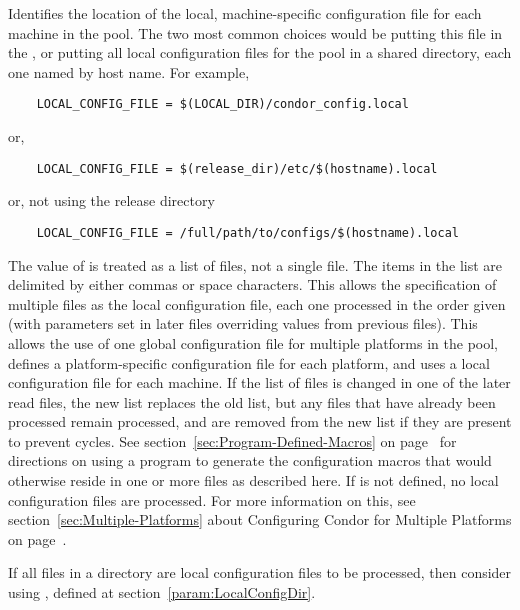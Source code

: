 \begin{description}
\label{param:LocalConfigFile}
\item[\Macro{LOCAL\_CONFIG\_FILE}]
  Identifies the
  location of the local, machine-specific configuration
  file for each machine
  in the pool.  The two most common choices would be putting this
  file in the , or putting all
  local configuration files for the pool in a shared directory, each one
  named by host name.  For example,
  \begin{verbatim}
    LOCAL_CONFIG_FILE = $(LOCAL_DIR)/condor_config.local
  \end{verbatim}
  or,
  \begin{verbatim}
    LOCAL_CONFIG_FILE = $(release_dir)/etc/$(hostname).local
  \end{verbatim}
  or, not using the release directory
  \begin{verbatim}
    LOCAL_CONFIG_FILE = /full/path/to/configs/$(hostname).local
  \end{verbatim}
  
  The value of  is treated as a list of files,
  not a
  single file.  The items in the list are delimited by either commas
  or space characters.
  This allows the specification of multiple files as
  the local configuration file, each one processed in the
  order given (with parameters set in later files overriding values
  from previous files).  This allows the use of one global
  configuration file for multiple platforms in the pool, defines a
  platform-specific configuration file for each platform, and uses a
  local configuration file for each machine. 
  If the list of files is changed in one of the later read files, the new list
  replaces the old list, but any files that have already been processed
  remain processed, and are removed from the new list if they are present
  to prevent cycles.
  See section~\ref{sec:Program-Defined-Macros} on 
  page~\pageref{sec:Program-Defined-Macros} for directions on
  using a program to generate the configuration macros that would
  otherwise reside in one or more files as described here.
  If  is not defined, no local configuration
  files are processed.  For more information on this, see
  section~\ref{sec:Multiple-Platforms} about Configuring Condor for
  Multiple Platforms on page~\pageref{sec:Multiple-Platforms}.

  If all files in a directory are local configuration files to be processed,
  then consider using , defined at
  section~\ref{param:LocalConfigDir}.


\end{description}
